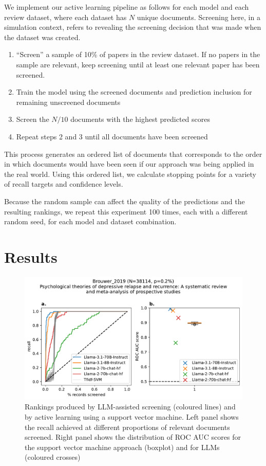 \documentclass{article}
\begin{document}
	We implement our active learning pipeline as follows for each model and each review dataset, where each dataset has $N$ unique documents. Screening here, in a simulation context, refers to revealing the screening decision that was made when the dataset was created.
	
	\begin{enumerate}
		\item ``Screen'' a sample of 10\% of papers in the review dataset. If no papers in the sample are relevant, keep screening until at least one relevant paper has been screened.
		\item Train the model using the screened documents and prediction inclusion for remaining unscreened documents
		\item Screen the $N/10$ documents with the highest predicted scores 
		\item Repeat steps 2 and 3 until all documents have been screened
	\end{enumerate}

	This process generates an ordered list of documents that corresponds to the order in which documents would have been seen if our approach was being applied in the real world. Using this ordered list, we calculate stopping points for a variety of recall targets and confidence levels.
	
	Because the random sample can affect the quality of the predictions and the resulting rankings, we repeat this experiment 100 times, each with a different random seed, for each model and dataset combination. 
	
	\section*{Results}
	
	\begin{figure}
		\includegraphics[width=\linewidth]{../../figures/Brouwer_2019.pdf}
		\caption{Rankings produced by LLM-assisted screening (coloured lines) and by active learning using a support vector machine. Left panel shows the recall achieved at different proportions of relevant documents screened. Right panel shows the distribution of ROC AUC scores for the support vector machine approach (boxplot) and for LLMs (coloured crosses)}
		\label{fig:rankings}
	\end{figure}
	
\end{document}
